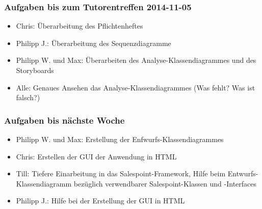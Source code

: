 \documentclass[12pt,a4paper]{article}
\begin{document}
\subsubsection*{Aufgaben bis zum Tutorentreffen 2014-11-05}
\begin{itemize}
\item Chris: Überarbeitung des Pflichtenheftes
\item Philipp J.: Überarbeitung des Sequenzdiagramme
\item Philipp W. und Max: Überarbeiten des Analyse-Klassendiagrammes und des Storyboards
\item Alle: Genaues Ansehen das Analyse-Klassendiagrammes (Was fehlt? Was ist falsch?)
\end{itemize}

\subsubsection*{Aufgaben bis nächste Woche}
\begin{itemize}
\item Philipp W. und Max: Erstellung der Enfwurfs-Klassendiagrammes
\item Chris: Erstellen der GUI der Anwendung in HTML
\item Till: Tiefere Einarbeitung in das Salespoint-Framework, Hilfe beim Entwurfs-Klassendiagramm bezüglich verwendbarer Salespoint-Klassen und -Interfaces
\item Philipp J.: Hilfe bei der Erstellung der GUI in HTML
\end{itemize}
\end{document}
